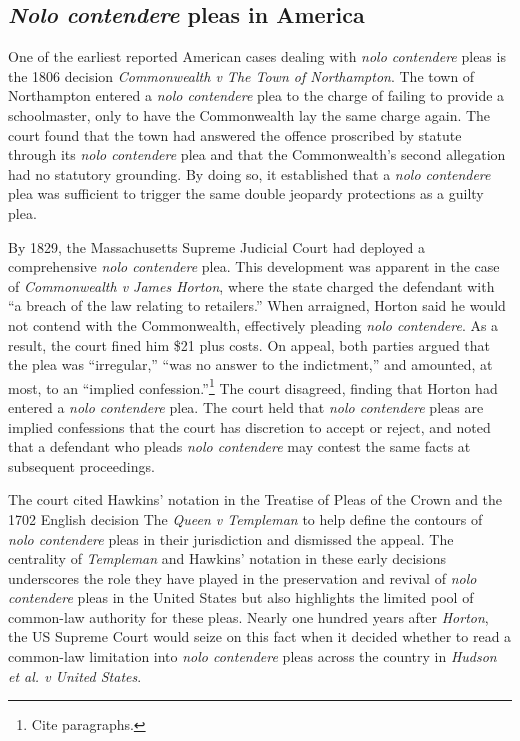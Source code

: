 \subsection{\textit{Nolo contendere} pleas in America}

One of the earliest reported American cases dealing with \textit{nolo contendere} pleas is the 1806 decision \textit{Commonwealth v The Town of Northampton}. The town of Northampton entered a \textit{nolo contendere} plea to the charge of failing to provide a schoolmaster, only to have the Commonwealth lay the same charge again. The court found that the town had answered the offence proscribed by statute through its \textit{nolo contendere} plea and that the Commonwealth's second allegation had no statutory grounding. By doing so, it established that a \textit{nolo contendere} plea was sufficient to trigger the same double jeopardy protections as a guilty plea.

By 1829, the Massachusetts Supreme Judicial Court had deployed a comprehensive \textit{nolo contendere} plea. This development was apparent in the case of \textit{Commonwealth v James Horton}, where the state charged the defendant with ``a breach of the law relating to retailers.'' When arraigned, Horton said he would not contend with the Commonwealth, effectively pleading \textit{nolo contendere}. As a result, the court fined him \$21 plus costs. On appeal, both parties argued that the plea was ``irregular,'' ``was no answer to the indictment,'' and amounted, at most, to an ``implied confession.''\footnote{Cite paragraphs.} The court disagreed, finding that Horton had entered a \textit{nolo contendere} plea. The court held that \textit{nolo contendere} pleas are implied confessions that the court has discretion to accept or reject, and noted that a defendant who pleads \textit{nolo contendere} may contest the same facts at subsequent proceedings. 

The court cited Hawkins' notation in the Treatise of Pleas of the Crown and the 1702 English decision The \textit{Queen v Templeman} to help define the contours of \textit{nolo contendere} pleas in their jurisdiction and dismissed the appeal. The centrality of \textit{Templeman} and Hawkins' notation in these early decisions underscores the role they have played in the preservation and revival of \textit{nolo contendere} pleas in the United States but also highlights the limited pool of common-law authority for these pleas. Nearly one hundred years after \textit{Horton}, the US Supreme Court would seize on this fact when it decided whether to read a common-law limitation into \textit{nolo contendere} pleas across the country in \textit{Hudson et al. v United States}.

